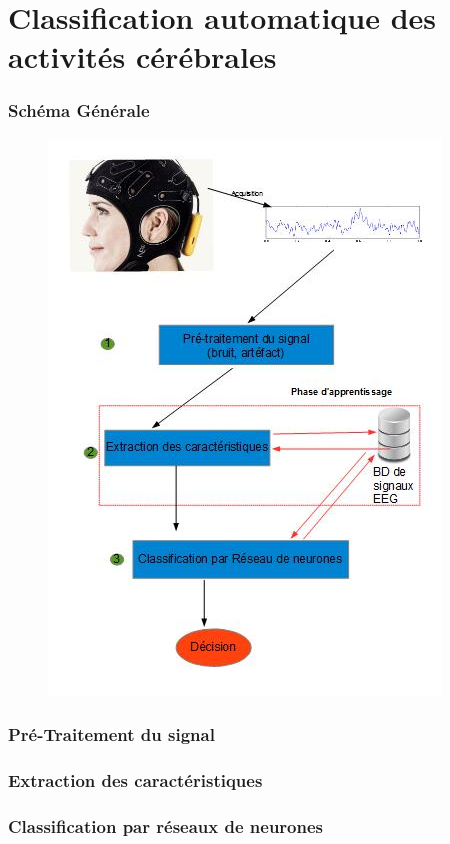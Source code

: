 \part{Classification automatique des activités cérébrales} %
\label{prt:classification_ _automatique_ _des_ _activités_ _cérébrales_}
	\section{Schéma Générale} %
		\label{sec:schéma_générale}
		\begin{figure}
			\centering
			    \includegraphics []{../organigramme/orga.jpg} \\
				\label{fig_orga}
			\end{figure}

	\section{Pré-Traitement du signal} %
	\label{sec:pré_traitement_du_signal}
	
	\section{Extraction des caractéristiques} %
	\label{sec:extraction_des_caractéristiques}
	
	\section{Classification par réseaux de neurones} %
	\label{sec:classification_par_réseaux_de_neurones}
	
